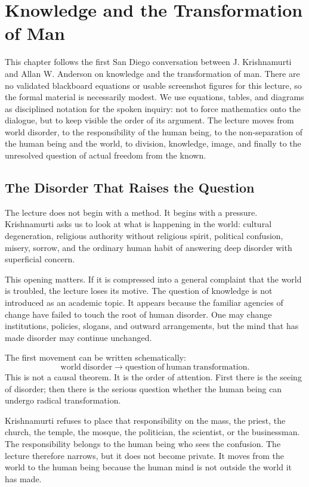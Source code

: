 \chapter{Knowledge and the Transformation of Man}

This chapter follows the first San Diego conversation between J. Krishnamurti and Allan W. Anderson on knowledge and the transformation of man. There are no validated blackboard equations or usable screenshot figures for this lecture, so the formal material is necessarily modest. We use equations, tables, and diagrams as disciplined notation for the spoken inquiry: not to force mathematics onto the dialogue, but to keep visible the order of its argument. The lecture moves from world disorder, to the responsibility of the human being, to the non-separation of the human being and the world, to division, knowledge, image, and finally to the unresolved question of actual freedom from the known.

\section{The Disorder That Raises the Question}

The lecture does not begin with a method. It begins with a pressure. Krishnamurti asks us to look at what is happening in the world: cultural degeneration, religious authority without religious spirit, political confusion, misery, sorrow, and the ordinary human habit of answering deep disorder with superficial concern.

This opening matters. If it is compressed into a general complaint that the world is troubled, the lecture loses its motive. The question of knowledge is not introduced as an academic topic. It appears because the familiar agencies of change have failed to touch the root of human disorder. One may change institutions, policies, slogans, and outward arrangements, but the mind that has made disorder may continue unchanged.

The first movement can be written schematically:
\begin{equation}
\mathrm{world\ disorder}
\longrightarrow
\mathrm{question\ of\ human\ transformation}.
\end{equation}
This is not a causal theorem. It is the order of attention. First there is the seeing of disorder; then there is the serious question whether the human being can undergo radical transformation.

Krishnamurti refuses to place that responsibility on the mass, the priest, the church, the temple, the mosque, the politician, the scientist, or the businessman. The responsibility belongs to the human being who sees the confusion. The lecture therefore narrows, but it does not become private. It moves from the world to the human being because the human mind is not outside the world it has made.

